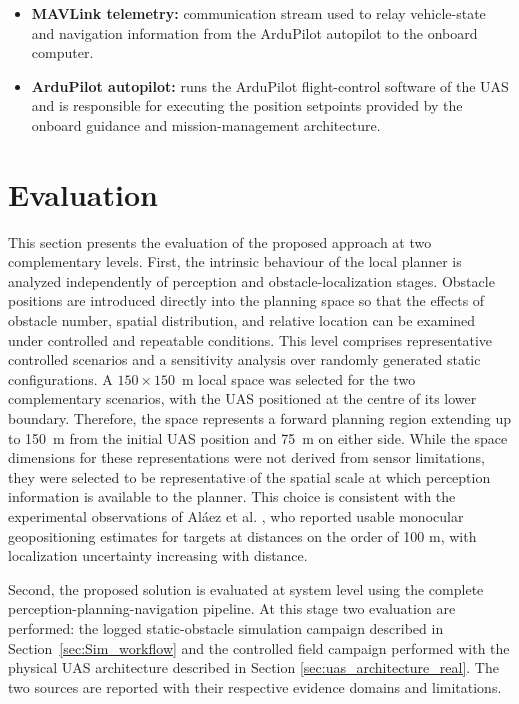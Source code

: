 \documentclass[electronics,article,submit,moreauthors]{Definitions/mdpi}
\DeclareRobustCommand{\deleted}[1]{}%
\DeclareRobustCommand{\added}[1]{#1}%
\DeclareRobustCommand{\deleted}[1]{\textcolor{black}{\sout{#1}}}
\DeclareRobustCommand{\added}[1]{\textcolor{green!50!black}{#1}}
\def\deleted#1{}%
\def\added#1{#1}%
\begin{document}
\begin{itemize}
    \item \textbf{MAVLink telemetry:} \deleted{Communication}\added{communication} stream used to relay \deleted{vehicle state}\added{vehicle-state} and navigation information from the ArduPilot autopilot to the onboard computer.
    \item \textbf{ArduPilot autopilot:} \deleted{Runs}\added{runs} the ArduPilot flight-control software of the UAS and is responsible for executing the position setpoints provided by the onboard guidance and \deleted{Mission-management}\added{mission-management} architecture.
\end{itemize}



\section{\deleted{Results}\added{Evaluation}}

\added{This section presents the evaluation of the proposed approach at two complementary levels. First, the intrinsic behaviour of the local planner is analyzed independently of perception and obstacle-localization stages. Obstacle positions are introduced directly into the planning space so that the effects of obstacle number, spatial distribution, and relative location can be examined under controlled and repeatable conditions. This level comprises representative controlled scenarios and a sensitivity analysis over randomly generated static configurations.} \added{A $150 \times 150$~m local space was selected for the two complementary scenarios, with the UAS positioned at the centre of its lower boundary. Therefore, the space represents a forward planning region extending up to 150~m from the initial UAS position and 75~m on either side. While the space dimensions for these representations were not derived from sensor limitations, they were selected to be representative of the spatial scale at which perception information is available to the planner. This choice is consistent with the experimental observations of Aláez et al. \cite{alaez2023real}, who reported usable monocular geopositioning estimates for targets at distances on the order of 100 m, with localization uncertainty increasing with distance.}

\added{Second, the proposed solution is evaluated at system level using the complete perception-planning-navigation pipeline. At this stage two evaluation are performed: the logged static-obstacle simulation campaign described in Section~\ref{sec:Sim_workflow} and the controlled field campaign performed with the physical UAS architecture described in Section \ref{sec:uas_architecture_real}. The two sources are reported with their respective evidence domains and limitations.}
\end{document}
